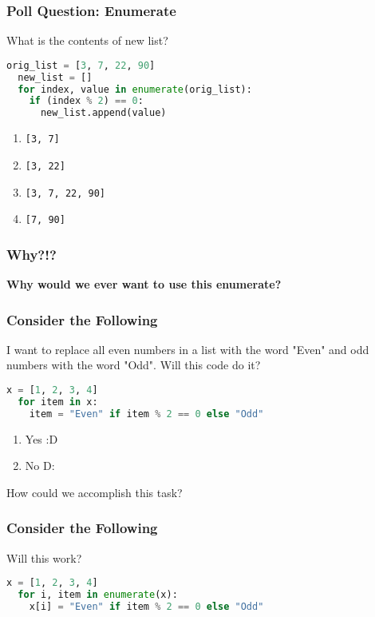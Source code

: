 \documentclass{beamer}
\begin{document}
%
%
\begin{frame}[fragile]
  \frametitle{Poll Question: Enumerate}
  What is the contents of new list?
  \begin{lstlisting}[language=Python, autogobble]
  orig_list = [3, 7, 22, 90]
  new_list = []
  for index, value in enumerate(orig_list):
    if (index % 2) == 0:
      new_list.append(value)
  \end{lstlisting}
  \vfill
  \begin{enumerate}[A]
    \item \lstinline|[3, 7]|
    \item \lstinline|[3, 22]|
    \item \lstinline|[3, 7, 22, 90]|
    \item \lstinline|[7, 90]|
  \end{enumerate}
\end{frame}

%
%
\begin{frame}[fragile]
  \frametitle{Why?!?}
  \textbf{Why would we ever want to use this enumerate?}
\end{frame}


%
%
\begin{frame}[fragile]
  \frametitle{Consider the Following}
  I want to replace all even numbers in a list with the word "Even" and odd numbers with the word "Odd". Will this code do it?
  \begin{lstlisting}[language=Python, autogobble]
  x = [1, 2, 3, 4]
  for item in x:
    item = "Even" if item % 2 == 0 else "Odd"
  \end{lstlisting}
  \vfill
  \begin{enumerate}[A]
    \item Yes :D
    \item No D:
  \end{enumerate}
  \pause
  How could we accomplish this task?
\end{frame}


%
%
\begin{frame}[fragile]
  \frametitle{Consider the Following}
  Will this work?
  \begin{lstlisting}[language=Python, autogobble]
  x = [1, 2, 3, 4]
  for i, item in enumerate(x):
    x[i] = "Even" if item % 2 == 0 else "Odd"
  \end{lstlisting}
\end{frame}
\end{document}
